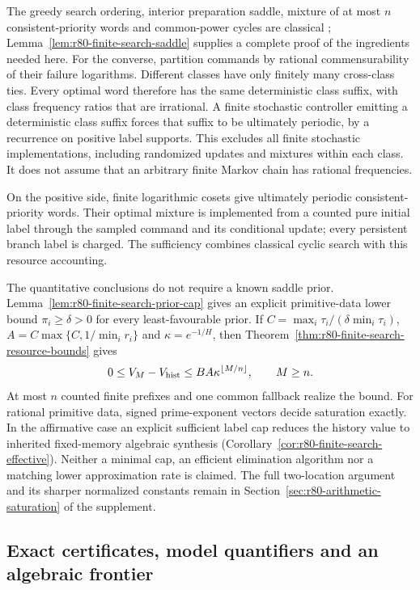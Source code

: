 The greedy search ordering, interior preparation saddle, mixture of
at most $n$ consistent-priority words and common-power cycles are
classical \cite{Matula1964,ClarksonLinGlazebrook2023};
Lemma~\ref{lem:r80-finite-search-saddle} supplies a complete proof of
the ingredients needed here.  For the converse, partition commands
by rational commensurability of their failure logarithms.  Different
classes have only finitely many cross-class ties.  Every optimal word
therefore has the same deterministic class suffix, with class
frequency ratios that are irrational.  A finite stochastic
controller emitting a deterministic class suffix forces that suffix
to be ultimately periodic, by a recurrence on positive label
supports.  This excludes all finite stochastic implementations,
including randomized updates and mixtures within each class.  It
does not assume that an arbitrary finite Markov chain has rational
frequencies.

On the positive side, finite logarithmic cosets give ultimately
periodic consistent-priority words.  Their optimal mixture is
implemented from a counted pure initial label through the sampled
command and its conditional update; every persistent branch label
is charged.  The sufficiency combines classical cyclic search with
this resource accounting.

The quantitative conclusions do not require a known saddle prior.
Lemma~\ref{lem:r80-finite-search-prior-cap} gives an explicit
primitive-data lower bound $\pi_i\ge\delta>0$ for every
least-favourable prior.  If
$C=\max_i\tau_i/(\delta\min_i\tau_i)$,
$A=C\max\{C,1/\min_i r_i\}$ and $\kappa=e^{-1/H}$, then
Theorem~\ref{thm:r80-finite-search-resource-bounds} gives
\[
 0\le V_M-V_{\rm hist}\le BA\kappa^{\lfloor M/n\rfloor},
 \qquad M\ge n.
\]
At most $n$ counted finite prefixes and one common fallback realize
the bound.  For rational primitive data, signed prime-exponent
vectors decide saturation exactly.  In the affirmative case an
explicit sufficient label cap reduces the history value to inherited
fixed-memory algebraic synthesis
(Corollary~\ref{cor:r80-finite-search-effective}).  Neither a minimal
cap, an efficient elimination algorithm nor a matching lower
approximation rate is claimed.  The full two-location argument and
its sharper normalized constants remain in
Section~\ref{sec:r80-arithmetic-saturation} of the supplement.

\subsection*{Exact certificates, model quantifiers and an algebraic frontier}

